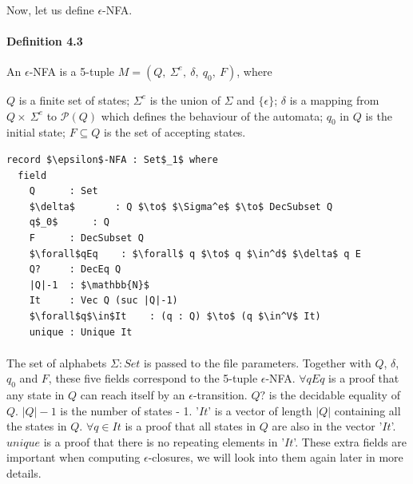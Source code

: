 \documentclass[twoside,openright,final]{bhamthesis}
\renewcommand{\item}{\itemindent0.5cm\itemold}
\begin{document}
\paragraph{} Now, let us define \(\epsilon\)-NFA. 

\paragraph{Definition 4.3} An \(\epsilon\)-NFA is a 5-tuple \(M = (Q
,\ \Sigma^e,\ \delta,\ q_0,\ F)\), where
\begin{enumerate}[nolistsep]
  \item \(Q\) is a finite set of states;
  \item \(\Sigma^e\) is the union of \(\Sigma\) and \(\{\epsilon\}\);
  \item \(\delta\) is a mapping from \(Q \times\ \Sigma^e\) to
    \(\mathcal P \left({Q}\right)\) which defines the behaviour of the automata;
  \item \(q_0\) in \(Q\) is the initial state;
  \item \(F \subseteq Q\) is the set of accepting states. 
\end{enumerate}
\vspace{0.7pc}
\begin{lstlisting}[caption=\(\epsilon\)-NFA,mathescape=true]
record $\epsilon$-NFA : Set$_1$ where
  field
    Q      : Set
    $\delta$       : Q $\to$ $\Sigma^e$ $\to$ DecSubset Q
    q$_0$      : Q
    F      : DecSubset Q
    $\forall$qEq    : $\forall$ q $\to$ q $\in^d$ $\delta$ q E
    Q?     : DecEq Q
    |Q|-1  : $\mathbb{N}$
    It     : Vec Q (suc |Q|-1)
    $\forall$q$\in$It    : (q : Q) $\to$ (q $\in^V$ It)
    unique : Unique It
\end{lstlisting}
\paragraph{} The set of alphabets \(\Sigma : Set\) is passed to the file
parameters. Together with \(Q\), \(\delta\),
\(q_0\) and \(F\), these five fields correspond to the 5-tuple
\(\epsilon\)-NFA. \(\forall qEq\) is a proof that any state in \(Q\)
can reach itself by an \(\epsilon\)-transition. \(Q?\) is
the decidable equality of \(Q\). \(|Q|-1\) is the number of states -
1. '\(It\)' is a vector of length \(|Q|\) containing all the
states in \(Q\). \(\forall q\in It\) is a
proof that all states in \(Q\) are also in the vector
'\(It\)'. \(unique\) is a proof that there is no repeating elements in
'\(It\)'. These extra fields are important when computing
\(\epsilon\)-closures, we will look into them again later in more
details.  
\end{document}
